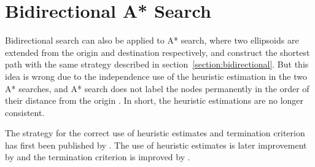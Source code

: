 \begin{comment}
\begin{algorithm}
Modifying Step 1 of the GSP for A* search:
    \caption{A* Search Algorithm}
    \begin{algorithmic}[1]
        \Procedure{AStar}{$s, t$}
        \State $\mathcal{Q} \gets \{s\}$ \Comment{Add node $s$ with $d_s = h_s$}
        \State $p_s \gets -1$
        \State $d_s \gets 0$
        \ForAll {$ u \in \mathcal{V} : u \neq s $} \Comment{All nodes unvisited except the source}
        \State $d_u \gets \infty$
    \EndFor

    \While{ $\mathcal{Q} \neq \emptyset$ }
    \State $ u \gets \text{top}(Q) $ \Comment{Remove $u$ such that $d_u + h_u = \displaystyle\min_{v \in \mathcal{Q}} \{ d_v + h_v \} $}
    \State $ \mathcal{Q} \gets \mathcal{Q} \char`\\ \{u\} $
    \If{ $u = t$ }
    \State \text{Terminate Procedure}
\EndIf
\If{ $u \neq \text{zone} $}
\ForAll {$v : (u, v) \in E$} \Comment{For all successors of $u$}
\If {$d_u + c_{vw} < d_v$}
\State $d_v \gets d_u + c_{vw}$
\State $p_v \gets u$
\State $\mathcal{Q} \gets \mathcal{Q} \cup \{v\}$ \Comment{Add node $v$ with $d_v = d_u + c_{vw} + h_v$}
                    \EndIf
                \EndFor
            \EndIf
        \EndWhile
    \EndProcedure
\end{algorithmic}
\todo[inline]{where are my $h$? heuristic?}
\end{algorithm}
\end{comment}

\section{Bidirectional A* Search}
Bidirectional search can also be applied to A* search,
where two ellipsoids are extended from the origin and destination respectively,
and construct the shortest path with the same strategy described in section~\ref{section:bidirectional}.
But this idea is wrong due to the independence use of the heuristic estimation in the two A* searches, and A* search does not label the nodes permanently in the order of their distance from the origin \citep{Klunder}.
In short, the heuristic estimations are no longer consistent.

The strategy for the correct use of heuristic estimates and termination criterion has first been published by \citet{Pohl}. The use of heuristic estimates is later improvement by \citet{Ikeda} and the termination criterion is improved by \citet{GoldbergEPP}.

